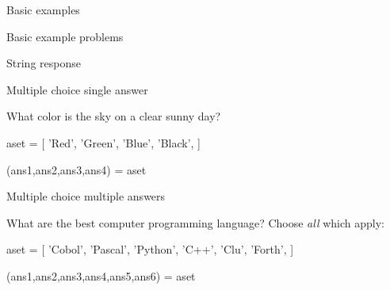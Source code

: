 \begin{edXchapter}{Basic examples}
\begin{edXsection}{Basic example problems}
\begin{edXvertical}
\begin{edXproblem}{String response}
\begin{edXsolution}
\end{edXsolution}

\end{edXproblem}


\end{edXvertical}


\begin{edXvertical}


\begin{edXproblem}{Multiple choice single answer}{}

What color is the sky on a clear sunny day?

\begin{edXscript}

aset = [ 'Red',
         'Green',
         'Blue',
         'Black',
      ]

(ans1,ans2,ans3,ans4) = aset

\end{edXscript}


\end{edXproblem}


\begin{edXproblem}{Multiple choice multiple answers}{}

What are the best computer programming language?  Choose {\em all} which apply:

\begin{edXscript}

aset = [ 'Cobol',
         'Pascal',
         'Python',
         'C++',
         'Clu',
         'Forth',
      ]

(ans1,ans2,ans3,ans4,ans5,ans6) = aset

\end{edXscript}


\end{edXproblem}

\end{edXvertical}


\begin{edXvertical}


\end{edXvertical}
\end{edXsection}
\end{edXchapter}
